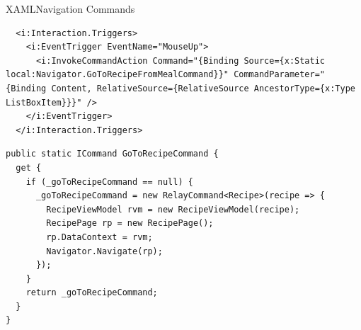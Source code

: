 \begin{frame}[fragile]{XAML}{Navigation Commands}
\begin{lstlisting}
  <i:Interaction.Triggers>
    <i:EventTrigger EventName="MouseUp">
      <i:InvokeCommandAction Command="{Binding Source={x:Static local:Navigator.GoToRecipeFromMealCommand}}" CommandParameter="{Binding Content, RelativeSource={RelativeSource AncestorType={x:Type ListBoxItem}}}" />
    </i:EventTrigger>
  </i:Interaction.Triggers>
\end{lstlisting}

\begin{lstlisting}
public static ICommand GoToRecipeCommand {
  get {
    if (_goToRecipeCommand == null) {
      _goToRecipeCommand = new RelayCommand<Recipe>(recipe => {
        RecipeViewModel rvm = new RecipeViewModel(recipe);
        RecipePage rp = new RecipePage();
        rp.DataContext = rvm;
        Navigator.Navigate(rp);
      });
    }
    return _goToRecipeCommand;
  }
}
\end{lstlisting}
\end{frame}
